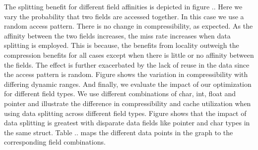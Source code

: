 The splitting benefit for different field affinities is depicted in figure .. Here we vary the probability that two fields are accessed together. In this case we use a random access pattern. There is no change in compressibility, as expected. As the affinity between the two fields increases, the miss rate increases when data splitting is employed. This is because, the benefits from locality outweigh the compression benefits for all cases except when there is little or no affinity between the fields. The effect is further exacerbated by the lack of reuse in the data since the access pattern is random. Figure shows the variation in compressibility with differing dynamic ranges. And finally, we evaluate the impact of our optimization for different field types. We use different combinations of char, int, float and pointer and illustrate the difference in compressibility and cache utilization when using data splitting across different field types. Figure shows that the impact of data splitting is greatest with disparate data fields like pointer and char types in the same struct. Table .. maps the different data points in the graph to the corresponding field combinations. 
